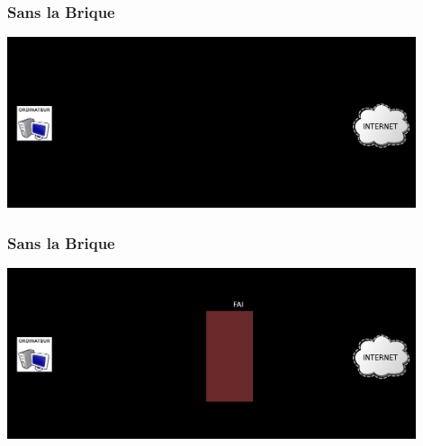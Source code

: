 \documentclass[notes=hide]{beamer}
\begin{document}
\begin{frame}[t,plain]
  \begin{center}
    \vspace{\fill}
    \vspace{\fill}
  \end{center}
\end{frame}

\begin{frame}[t,plain]
  \begin{center}
    \vspace{\fill}
    \vspace{\fill}
  \end{center}
\end{frame}

\begin{frame}[t]
\frametitle{\textcolor{titre}{Sans la Brique}}
  \color{red!60} %
  \begin{center}
    \includegraphics[width=0.9\textwidth]{img2/connexion1.png}
  \end{center}
\end{frame}

\begin{frame}[t]
\frametitle{\textcolor{titre}{Sans la Brique}}
  \begin{center}
    \includegraphics[width=0.9\textwidth]{img2/connexion2.png}
  \end{center}
\end{frame}
\end{document}
